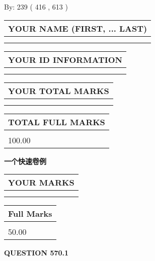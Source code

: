 \documentclass{ctexart}
\begin{document}
   
\hspace{1.0in} By: 
 239 ( 416 ,  613 )
   
   
   
   
\newpage 
\setcounter{page}{ 
   570001 } 
   
   
   
   
\noindent\begin{tabular}{|l|}
\hline
YOUR NAME (FIRST, ... LAST)  \\
\hline
 \\ 
 \\ 
\hline
\end{tabular}
\hspace{0.05in} \begin{tabular}{|l|}
\hline
 YOUR   ID   INFORMATION  \\
\hline
 \\ 
 \\ 
\hline
\end{tabular}
   
   
\vspace{0.2in}\noindent\begin{tabular}{|l|}
\hline
YOUR TOTAL MARKS  \\
\hline
 \\ 
 \\ 
\hline
\end{tabular}
\hspace{0.05in} \begin{tabular}{|l|}
\hline
TOTAL FULL MARKS  \\
\hline
 \\ 
100.00 \\
\hline
\end{tabular}
   
   
 \vspace{0.2in}
{\LARGE {\textbf{ 一个快速卷例}}}
   
   
  
\vspace{0.2in}
  
\noindent\begin{tabular}{|l|}
\hline
 YOUR MARKS  \\
\hline
 \\ 
 \\ 
\hline
\end{tabular}
\hspace{0.05in} \begin{tabular}{|l|}
\hline
 Full Marks  \\
\hline
 \\ 
50.00 \\
\hline
\end{tabular}
{\textbf{\Large{QUESTION
570.1 
}}}
  
\end{document}
